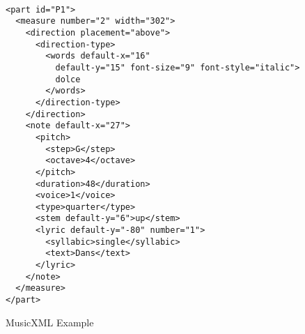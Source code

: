 \begin{figure}
  \begin{center}
  \begin{Verbatim}[fontfamily=courier, xleftmargin=\parindent]

<part id="P1">
  <measure number="2" width="302">
    <direction placement="above">
      <direction-type>
        <words default-x="16"
          default-y="15" font-size="9" font-style="italic">
          dolce
        </words>
      </direction-type>
    </direction>
    <note default-x="27">
      <pitch>
        <step>G</step>
        <octave>4</octave>
      </pitch>
      <duration>48</duration>
      <voice>1</voice>
      <type>quarter</type>
      <stem default-y="6">up</stem>
      <lyric default-y="-80" number="1">
        <syllabic>single</syllabic>
        <text>Dans</text>
      </lyric>
    </note>
  </measure>
</part>
  \end{Verbatim}
  \caption{MusicXML Example}
  \label{fig:xmlVoice}
 \end{center}
\end{figure}